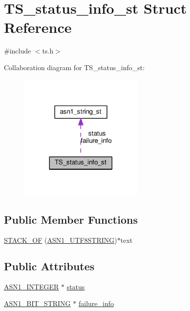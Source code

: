 \hypertarget{struct_t_s__status__info__st}{}\section{T\+S\+\_\+status\+\_\+info\+\_\+st Struct Reference}
\label{struct_t_s__status__info__st}


{\ttfamily \#include $<$ts.\+h$>$}



Collaboration diagram for T\+S\+\_\+status\+\_\+info\+\_\+st\+:
\nopagebreak
\begin{figure}[H]
\begin{center}
\leavevmode
\includegraphics[width=176pt]{struct_t_s__status__info__st__coll__graph}
\end{center}
\end{figure}
\subsection*{Public Member Functions}
\begin{DoxyCompactItemize}
\item 
\hyperlink{struct_t_s__status__info__st_afbb53add328d781d5b5a48e13a8603c9}{S\+T\+A\+C\+K\+\_\+\+OF} (\hyperlink{ossl__typ_8h_ad7ed3ce45259147bc338c4849377d2bb}{A\+S\+N1\+\_\+\+U\+T\+F8\+S\+T\+R\+I\+NG})$\ast$text
\end{DoxyCompactItemize}
\subsection*{Public Attributes}
\begin{DoxyCompactItemize}
\item 
\hyperlink{ossl__typ_8h_af4335399bf9774cb410a5e93de65998b}{A\+S\+N1\+\_\+\+I\+N\+T\+E\+G\+ER} $\ast$ \hyperlink{struct_t_s__status__info__st_a1bbc97b14de94cd43623becfd70a254e}{status}
\item 
\hyperlink{ossl__typ_8h_af837aaa00e151b1e8773aea5a8fe1cc4}{A\+S\+N1\+\_\+\+B\+I\+T\+\_\+\+S\+T\+R\+I\+NG} $\ast$ \hyperlink{struct_t_s__status__info__st_a20343fe14840039fb382b1b08da0104d}{failure\+\_\+info}
\end{DoxyCompactItemize}


